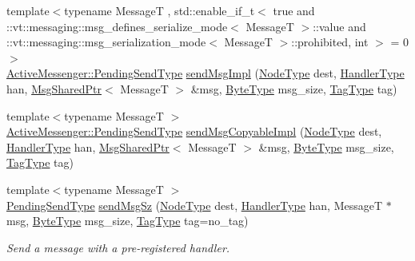 \begin{DoxyCompactItemize}
\item 
{\footnotesize template$<$typename MessageT , std\+::enable\+\_\+if\+\_\+t$<$ true and \+::vt\+::messaging\+::msg\+\_\+defines\+\_\+serialize\+\_\+mode$<$ Message\+T $>$\+::value and \+::vt\+::messaging\+::msg\+\_\+serialization\+\_\+mode$<$ Message\+T $>$\+::prohibited, int $>$  = 0$>$ }\\\hyperlink{structvt_1_1messaging_1_1_active_messenger_a3626a6ca76d8ad4ec7c3b47a2c70d3a8}{Active\+Messenger\+::\+Pending\+Send\+Type} \hyperlink{structvt_1_1messaging_1_1_active_messenger_a7f2e8867a9d967eb7f43df7d5c420775}{send\+Msg\+Impl} (\hyperlink{namespacevt_a866da9d0efc19c0a1ce79e9e492f47e2}{Node\+Type} dest, \hyperlink{namespacevt_af64846b57dfcaf104da3ef6967917573}{Handler\+Type} han, \hyperlink{structvt_1_1messaging_1_1_msg_shared_ptr}{Msg\+Shared\+Ptr}$<$ MessageT $>$ \&msg, \hyperlink{namespacevt_aab8d55968084610ce3b17057981e9300}{Byte\+Type} msg\+\_\+size, \hyperlink{namespacevt_a84ab281dae04a52a4b243d6bf62d0e52}{Tag\+Type} tag)
\item 
{\footnotesize template$<$typename MessageT $>$ }\\\hyperlink{structvt_1_1messaging_1_1_active_messenger_a3626a6ca76d8ad4ec7c3b47a2c70d3a8}{Active\+Messenger\+::\+Pending\+Send\+Type} \hyperlink{structvt_1_1messaging_1_1_active_messenger_a9150be86c098ac678657ed3b34b3b1fb}{send\+Msg\+Copyable\+Impl} (\hyperlink{namespacevt_a866da9d0efc19c0a1ce79e9e492f47e2}{Node\+Type} dest, \hyperlink{namespacevt_af64846b57dfcaf104da3ef6967917573}{Handler\+Type} han, \hyperlink{structvt_1_1messaging_1_1_msg_shared_ptr}{Msg\+Shared\+Ptr}$<$ MessageT $>$ \&msg, \hyperlink{namespacevt_aab8d55968084610ce3b17057981e9300}{Byte\+Type} msg\+\_\+size, \hyperlink{namespacevt_a84ab281dae04a52a4b243d6bf62d0e52}{Tag\+Type} tag)
\item 
{\footnotesize template$<$typename MessageT $>$ }\\\hyperlink{structvt_1_1messaging_1_1_active_messenger_a3626a6ca76d8ad4ec7c3b47a2c70d3a8}{Pending\+Send\+Type} \hyperlink{group__preregister_ga2476af8744705ddb66f92f616bfc5bb0}{send\+Msg\+Sz} (\hyperlink{namespacevt_a866da9d0efc19c0a1ce79e9e492f47e2}{Node\+Type} dest, \hyperlink{namespacevt_af64846b57dfcaf104da3ef6967917573}{Handler\+Type} han, MessageT $\ast$msg, \hyperlink{namespacevt_aab8d55968084610ce3b17057981e9300}{Byte\+Type} msg\+\_\+size, \hyperlink{namespacevt_a84ab281dae04a52a4b243d6bf62d0e52}{Tag\+Type} tag=no\+\_\+tag)
\begin{DoxyCompactList}\small\item\em Send a message with a pre-\/registered handler. \end{DoxyCompactList}\item 

\end{DoxyCompactItemize}
